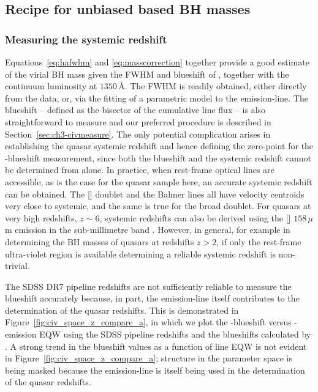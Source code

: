 \label{sec:ch3-application}

\subsection{Recipe for unbiased  based BH masses}
\label{sec:ch3-recipe}

\subsubsection{Measuring the systemic redshift}

Equations~\ref{eq:hafwhm} and \ref{eq:masscorrection} together provide a good estimate of the virial BH mass given the FWHM and blueshift of , together with the continuum luminosity at $1350$\,\AA.
The FWHM is readily obtained, either directly from the data, or, via the fitting of a parametric model to the  emission-line.
The blueshift -- defined as the bisector of the cumulative line flux -- is also straightforward to measure and our preferred procedure is described in Section~\ref{sec:ch3-civmeasure}.
The only potential complication arises in establishing the quasar systemic redshift and hence defining the zero-point for the -blueshift measurement, since both the blueshift and the systemic redshift cannot be determined from  alone.
In practice, when rest-frame optical lines are accessible, as is the case for the quasar sample here, an accurate systemic redshift can be obtained.
The [] doublet and the Balmer lines all have velocity centroids very close to systemic, and the same is true for the broad  doublet.
For quasars at very high redshifts, $z\sim6$, systemic redshifts can also be derived using the [] $158$\,$\mu$m emission in the sub-millimetre band \citep[e.g.][]{venemans16}.
However, in general, for example in determining the BH masses of quasars at redshifts $z>2$, if only the rest-frame ultra-violet region is available determining a reliable systemic redshift is non-trivial.

The SDSS DR$7$ pipeline redshifts are not sufficiently reliable to measure the  blueshift accurately because, in part, the  emission-line itself contributes to the determination of the quasar redshifts.
This is demonstrated in Figure~\ref{fig:civ_space_z_compare_a}, in which we plot the -blueshift versus -emission EQW using the SDSS pipeline redshifts and the blueshifts calculated by \citet{shen11}.
A strong trend in the blueshift values as a function of line EQW is not evident in Figure~\ref{fig:civ_space_z_compare_a}; structure in the parameter space is being masked because the  emission-line is itself being used in the determination of the quasar redshifts.

